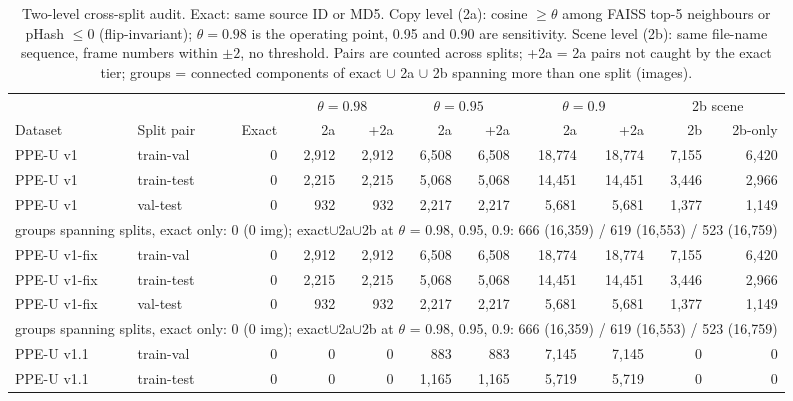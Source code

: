 \begin{table}[t]
\centering\footnotesize
\caption{Two-level cross-split audit. Exact: same source ID or MD5. Copy level (2a): cosine $\ge\theta$ among FAISS top-5 neighbours or pHash $\le 0$ (flip-invariant); $\theta=0.98$ is the operating point, 0.95 and 0.90 are sensitivity. Scene level (2b): same file-name sequence, frame numbers within $\pm2$, no threshold. Pairs are counted across splits; +2a = 2a pairs not caught by the exact tier; groups = connected components of exact $\cup$ 2a $\cup$ 2b spanning more than one split (images).}
\label{tab:audit_v2}
\begin{tabular}{ll r rr rr rr rr}
\toprule
 & & & \multicolumn{2}{c}{$\theta=0.98$} & \multicolumn{2}{c}{$\theta=0.95$} & \multicolumn{2}{c}{$\theta=0.9$} & \multicolumn{2}{c}{2b scene} \\
\cmidrule(lr){4-5} \cmidrule(lr){6-7} \cmidrule(lr){8-9} \cmidrule(lr){10-11}
Dataset & Split pair & Exact & 2a & +2a & 2a & +2a & 2a & +2a & 2b & 2b-only \\
\midrule
PPE-U v1 & train-val & 0 & 2{,}912 & 2{,}912 & 6{,}508 & 6{,}508 & 18{,}774 & 18{,}774 & 7{,}155 & 6{,}420 \\
PPE-U v1 & train-test & 0 & 2{,}215 & 2{,}215 & 5{,}068 & 5{,}068 & 14{,}451 & 14{,}451 & 3{,}446 & 2{,}966 \\
PPE-U v1 & val-test & 0 & 932 & 932 & 2{,}217 & 2{,}217 & 5{,}681 & 5{,}681 & 1{,}377 & 1{,}149 \\
\multicolumn{11}{r}{\scriptsize groups spanning splits, exact only: 0 (0 img); exact$\cup$2a$\cup$2b at $\theta$ = 0.98, 0.95, 0.9: 666 (16{,}359) / 619 (16{,}553) / 523 (16{,}759)} \\
\midrule
PPE-U v1-fix & train-val & 0 & 2{,}912 & 2{,}912 & 6{,}508 & 6{,}508 & 18{,}774 & 18{,}774 & 7{,}155 & 6{,}420 \\
PPE-U v1-fix & train-test & 0 & 2{,}215 & 2{,}215 & 5{,}068 & 5{,}068 & 14{,}451 & 14{,}451 & 3{,}446 & 2{,}966 \\
PPE-U v1-fix & val-test & 0 & 932 & 932 & 2{,}217 & 2{,}217 & 5{,}681 & 5{,}681 & 1{,}377 & 1{,}149 \\
\multicolumn{11}{r}{\scriptsize groups spanning splits, exact only: 0 (0 img); exact$\cup$2a$\cup$2b at $\theta$ = 0.98, 0.95, 0.9: 666 (16{,}359) / 619 (16{,}553) / 523 (16{,}759)} \\
\midrule
PPE-U v1.1 & train-val & 0 & 0 & 0 & 883 & 883 & 7{,}145 & 7{,}145 & 0 & 0 \\
PPE-U v1.1 & train-test & 0 & 0 & 0 & 1{,}165 & 1{,}165 & 5{,}719 & 5{,}719 & 0 & 0 \\

\end{tabular}
\end{table}
